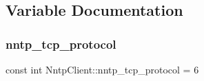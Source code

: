 \subsection{Variable Documentation}
\hypertarget{namespace_nntp_client_a6a246ad62d0a9fcfe4428ecd83079e1d}{}\label{namespace_nntp_client_a6a246ad62d0a9fcfe4428ecd83079e1d} 
\subsubsection{\texorpdfstring{nntp\+\_\+tcp\+\_\+protocol}{nntp\_tcp\_protocol}}
{\footnotesize\ttfamily const int Nntp\+Client\+::nntp\+\_\+tcp\+\_\+protocol = 6}

